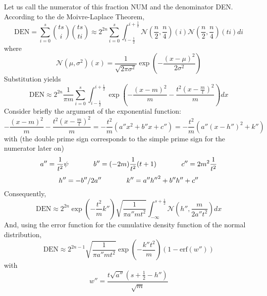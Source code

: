 \documentclass[11pt]{article}
\newcommand{\erf}[0]{\mbox{erf}}
\newcommand{\aden}[0]{a''}
\newcommand{\bden}[0]{b''}
\newcommand{\cden}[0]{c''}
\newcommand{\hden}[0]{h''}
\newcommand{\kden}[0]{k''}
\newcommand{\wden}[0]{w''}
\begin{document}
Let us call the numerator of this fraction NUM and the denominator
DEN. According to the de Moivre-Laplace Theorem,
\begin{displaymath}
  \mbox{DEN}=\sum_{i=0}^{s}\binom{ts}{i}\binom{ts}{ti}\approx{}2^{2n}\sum_{i=0}^{s}\int_{i-\frac{1}{2}}^{i+\frac{1}{2}}\mathcal{N}(\frac{n}{2},\frac{n}{4})(i)\mathcal{N}(\frac{n}{2},\frac{n}{4})(ti)di
\end{displaymath}
where
\begin{displaymath}
  \mathcal{N}(\mu,\sigma^{2})(x)=\frac{1}{\sqrt{2\pi\sigma^{2}}}\exp\left(-\frac{(x-\mu)^{2}}{2\sigma^{2}}\right)
\end{displaymath}
Substitution yields
\begin{displaymath}
  \mbox{DEN}\approx{}2^{2n}\frac{1}{\pi{}m}\sum_{i=0}^{s}\int_{i-\frac{1}{2}}^{i+\frac{1}{2}}\exp\left(-\frac{\left(x-m\right)^{2}}{m}-\frac{t^{2}\left(x-\frac{m}{t}\right)^{2}}{m}\right)dx
\end{displaymath}
Consider briefly the argument of the exponential function:
\begin{displaymath}
  -\frac{\left(x-m\right)^{2}}{m}-\frac{t^{2}\left(x-\frac{m}{t}\right)^{2}}{m}=-\frac{t^{2}}{m}({\aden}x^{2}+{\bden}x+{\cden})=-\frac{t^{2}}{m}\left({\aden}(x-{\hden})^{2}+{\kden}\right)
\end{displaymath}
with (the double prime sign corresponds to the simple prime sign for
the numerator later on)
\begin{displaymath}
{\aden}=\frac{1}{t^{2}}\psi\notag\hspace{.5in}
{\bden}=(-2m)\frac{1}{t^{2}}(t+1)\hspace{.5in}
{\cden}=2m^{2}\frac{1}{t^{2}}
\end{displaymath}
\begin{displaymath}
{\hden}=-{\bden}/2{\aden}\hspace{.5in}
{\kden}={\aden}{\hden}^{2}+{\bden}{\hden}+{\cden}
\end{displaymath}
Consequently,
\begin{displaymath}
\mbox{DEN}\approx{}2^{2n}\exp\left(-\frac{t^{2}}{m}{\kden}\right)\sqrt{\frac{1}{\pi{}{\aden}mt^{2}}}\int_{-\infty}^{s+\frac{1}{2}}\mathcal{N}\left({\hden},\frac{m}{2{\aden}t^{2}}\right)dx
\end{displaymath}
And, using the error function for the cumulative density function of
the normal distribution,
\begin{equation}
  \label{eq:den}
  \mbox{DEN}\approx{}2^{2n-1}\sqrt{\frac{1}{\pi{}{\aden}mt^{2}}}\exp\left(-\frac{{\kden}t^{2}}{m}\right)\left(1-\erf({\wden})\right)
\end{equation}
with
\begin{displaymath}
  {\wden}=\frac{t\sqrt{{\aden}}\left(s+\frac{1}{2}-{\hden}\right)}{\sqrt{m}}
\end{displaymath}
\end{document}
